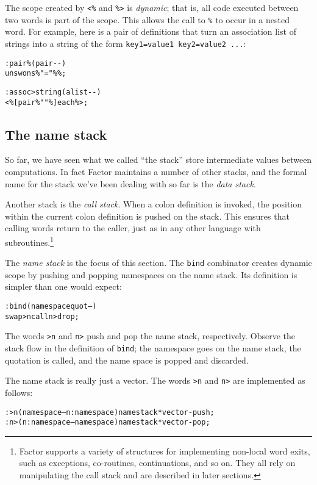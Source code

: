 \documentclass[english]{article}
\begin{document}
The scope created by \texttt{<\%} and \texttt{\%>} is \emph{dynamic}; that is, all code executed between two words is part of the scope. This allows the call to \texttt{\%} to occur in a nested word. For example, here is a pair of definitions that turn an association list of strings into a string of the form \texttt{key1=value1 key2=value2 ...}:

\begin{alltt}
: pair\% ( pair -{}- )
    unswons \% "=" \% \% ;

: assoc>string ( alist -{}- )
    <\% [ pair\% " " \% ] each \%> ;
\end{alltt}

\subsection{The name stack}

So far, we have seen what we called ``the stack'' store intermediate values between computations. In fact Factor maintains a number of other stacks, and the formal name for the stack we've been dealing with so far is the \emph{data stack}.

Another stack is the \emph{call stack}. When a colon definition is invoked, the position within the current colon definition is pushed on the stack. This ensures that calling words return to the caller, just as in any other language with subroutines.\footnote{Factor supports a variety of structures for implementing non-local word exits, such as exceptions, co-routines, continuations, and so on. They all rely on manipulating the call stack and are described in later sections.}

The \emph{name stack} is the focus of this section. The \texttt{bind} combinator creates dynamic scope by pushing and popping namespaces on the name stack. Its definition is simpler than one would expect:

\begin{alltt}
: bind ( namespace quot -- )
    swap >n call n> drop ;
\end{alltt}

The words \texttt{>n} and \texttt{n>} push and pop the name stack, respectively. Observe the stack flow in the definition of \texttt{bind}; the namespace goes on the name stack, the quotation is called, and the name space is popped and discarded.

The name stack is really just a vector. The words \texttt{>n} and \texttt{n>} are implemented as follows:

\begin{alltt}
: >n ( namespace -- n:namespace ) namestack* vector-push ;
: n> ( n:namespace -- namespace ) namestack* vector-pop ;
\end{alltt}
\end{document}
